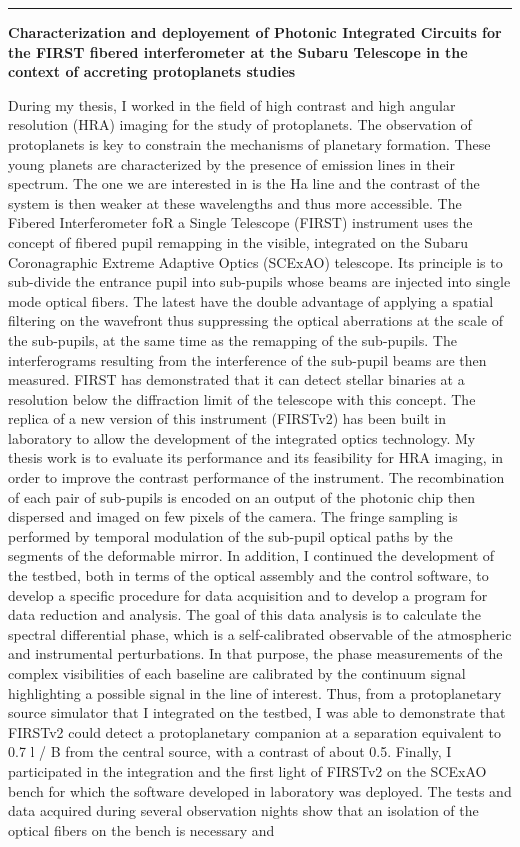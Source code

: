 \noindent\rule[2pt]{\textwidth}{0.5pt}
\begin{center}
    \large\textbf{Characterization and deployement of Photonic Integrated Circuits for the FIRST fibered interferometer at the Subaru Telescope in the context of accreting protoplanets studies\\}
\end{center}
    \footnotesize During my thesis, I worked in the field of high contrast and high angular resolution (HRA) imaging for the study of protoplanets. The observation of protoplanets is key to constrain the mechanisms of planetary formation. These young planets are characterized by the presence of emission lines in their spectrum. The one we are interested in is the Ha line and the contrast of the system is then weaker at these wavelengths and thus more accessible. The Fibered Interferometer foR a Single Telescope (FIRST) instrument uses the concept of fibered pupil remapping in the visible, integrated on the Subaru Coronagraphic Extreme Adaptive Optics (SCExAO) telescope. Its principle is to sub-divide the entrance pupil into sub-pupils whose beams are injected into single mode optical fibers. The latest have the double advantage of applying a spatial filtering on the wavefront thus suppressing the optical aberrations at the scale of the sub-pupils, at the same time as the remapping of the sub-pupils. The interferograms resulting from the interference of the sub-pupil beams are then measured. FIRST has demonstrated that it can detect stellar binaries at a resolution below the diffraction limit of the telescope with this concept. The replica of a new version of this instrument (FIRSTv2) has been built in laboratory to allow the development of the integrated optics technology. My thesis work is to evaluate its performance and its feasibility for HRA imaging, in order to improve the contrast performance of the instrument. The recombination of each pair of sub-pupils is encoded on an output of the photonic chip then dispersed and imaged on few pixels of the camera. The fringe sampling is performed by temporal modulation of the sub-pupil optical paths by the segments of the deformable mirror. In addition, I continued the development of the testbed, both in terms of the optical assembly and the control software, to develop a specific procedure for data acquisition and to develop a program for data reduction and analysis. The goal of this data analysis  is to calculate the spectral differential phase, which is a self-calibrated observable of the atmospheric and instrumental perturbations. In that purpose, the phase measurements of the complex visibilities of each baseline are calibrated by the continuum signal highlighting a possible signal in the line of interest. Thus, from a protoplanetary source simulator that I integrated on the testbed, I was able to demonstrate that FIRSTv2 could detect a protoplanetary companion at a separation equivalent to 0.7 l / B from the central source, with a contrast of about 0.5. Finally, I participated in the integration and the first light of FIRSTv2 on the SCExAO bench for which the software developed in laboratory was deployed. The tests and data acquired during several observation nights show that an isolation of the optical fibers on the bench is necessary and 